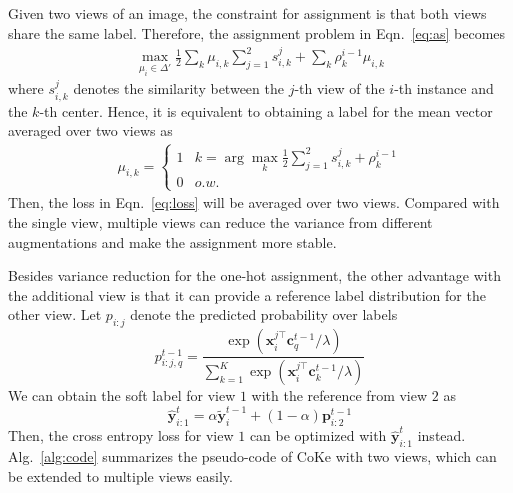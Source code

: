 \documentclass[10pt,twocolumn,letterpaper]{article}
\def \x {\mathbf{x}}
\def \cc {\mathbf{c}}
\def \y {\mathbf{y}}
\def \y {\mathbf{y}}
\def \p {\mathbf{p}}
\begin{document}
Given two views of an image, the constraint for assignment is that both views share the same label. Therefore, the assignment problem in Eqn.~\ref{eq:as} becomes
\begin{eqnarray*}
\max_{\mu_{i}\in\Delta'} \frac{1}{2}\sum_k\mu_{i,k}\sum_{j=1}^{2}  s_{i,k}^j  + \sum_k\rho_k^{i-1} \mu_{i,k}
\end{eqnarray*}
where $s_{i,k}^j$ denotes the similarity between the $j$-th view of the $i$-th instance and the $k$-th center. Hence, it is equivalent to obtaining a label for the mean vector averaged over two views as
\begin{eqnarray}\label{eq:twomu}
\mu_{i,k} = \left\{\begin{array}{cc}1&k=\arg\max_k \frac{1}{2}\sum_{j=1}^2 s_{i,k}^j+\rho_k^{i-1}\\0&o.w.\end{array}\right.
\end{eqnarray}
Then, the loss in Eqn.~\ref{eq:loss} will be averaged over two views. Compared with the single view, multiple views can reduce the variance from different augmentations and make the assignment more stable. 

Besides variance reduction for the one-hot assignment, the other advantage with the additional view is that it can provide a reference label distribution for the other view. Let $p_{i:j}$ denote the predicted probability over labels
\[p_{i:j,q}^{t-1} = \frac{\exp(\x_i^{j\top} \cc_q^{t-1}/\lambda)}{\sum_{k=1}^K \exp(\x_i^{j\top} \cc_{k}^{t-1}/\lambda)}\]
We can obtain the soft label for view $1$ with the reference from view $2$ as \[\hat{\y}_{i:1}^{t} = \alpha\tilde{\y}_i^{t-1} + (1-\alpha)\p_{i:2}^{t-1}\]
Then, the cross entropy loss for view $1$ can be optimized with $\hat{\y}_{i:1}^{t}$ instead. Alg.~\ref{alg:code} summarizes the pseudo-code of CoKe with two views, which can be extended to multiple views easily.
\end{document}
